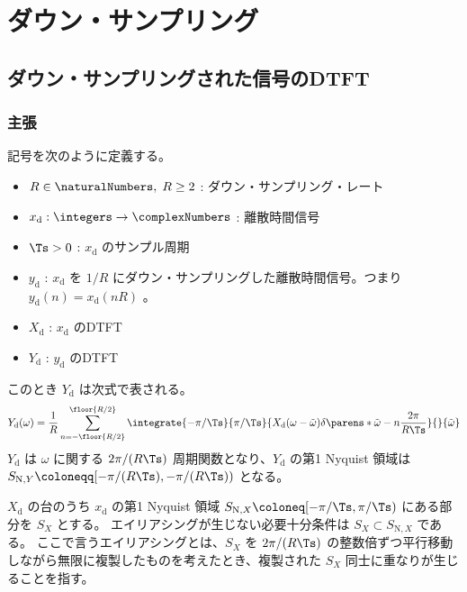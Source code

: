 \chapter{ダウン・サンプリング}
    \section{ダウン・サンプリングされた信号のDTFT}
        \newcommand{\xd}{x_\text{d}}
        \newcommand{\yd}{y_\text{d}}
        \newcommand{\Xd}{X_\text{d}}
        \newcommand{\Yd}{Y_\text{d}}
        \subsection{主張}
            記号を次のように定義する。
            \begin{itemize}
                \item $R\in\naturalNumbers,\;R\geq 2$ : ダウン・サンプリング・レート
                \item $\xd:\integers\to\complexNumbers$ : 離散時間信号
                \item $\Ts>0$ : $\xd$ のサンプル周期
                \item $\yd$ : $\xd$ を $1/R$ にダウン・サンプリングした離散時間信号。つまり $\yd(n) = \xd(nR)$ 。
                \item $\Xd$ : $\xd$ のDTFT
                \item $\Yd$ : $\yd$ のDTFT
            \end{itemize}
            このとき $\Yd$ は次式で表される。
            \[ \Yd(\omega) = \frac{1}{R}\sum_{n=-\floor{R/2}}^{\floor{R/2}} \integrate{-\pi/\Ts}{\pi/\Ts}{\Xd(\omega-\tilde{\omega})\delta\parens*{\tilde{\omega}-n\frac{2\pi}{R\Ts}}}{}{\tilde{\omega}} \]
            $\Yd$ は $\omega$ に関する $2\pi/(R\Ts)$ 周期関数となり、$\Yd$ の第1 Nyquist 領域は $S_{\text{N},Y} \coloneqq [-\pi/(R\Ts),-\pi/(R\Ts))$ となる。
            \par
            $\Xd$ の台のうち $\xd$ の第1 Nyquist 領域 $S_{\text{N},X} \coloneq [-\pi/\Ts, \pi/\Ts)$ にある部分を $S_X$ とする。
            エイリアシングが生じない必要十分条件は $S_X\subset S_{\text{N},X}$ である。
            ここで言うエイリアシングとは、$S_X$ を $2\pi/(R\Ts)$ の整数倍ずつ平行移動しながら無限に複製したものを考えたとき、複製された $S_X$ 同士に重なりが生じることを指す。
